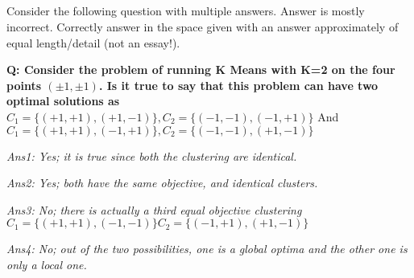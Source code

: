 \begin{frame}
\section{}
Consider the following question with multiple answers. Answer is mostly incorrect. Correctly answer in the space given with an answer approximately of equal length/detail (not an essay!).

{\bf Q: Consider the problem of running K Means with K=2 on the four points $(\pm 1, \pm 1)$. Is it true to say that this problem can have two optimal solutions as $C_1 = \{(+1,+1), (+1,-1)\}, C_2 = \{ (-1,-1), (-1,+1)\}$} And $C_1 = \{(+1,+1), (-1,+1)\}, C_2 = \{ (-1,-1), (+1,-1)\}$

{\em Ans1: Yes; it is true since both the clustering are identical.}

{\em Ans2: Yes; both have the same objective, and identical clusters.}

{\em Ans3: No; there is actually a third equal objective clustering
$C_1 = \{(+1,+1), (-1,-1)\} C_2 = \{ (-1,+1), (+1,-1)\}$}

{\em Ans4: No; out of the two possibilities, one is a global optima and the other one is only a local one.}


\end{frame}

